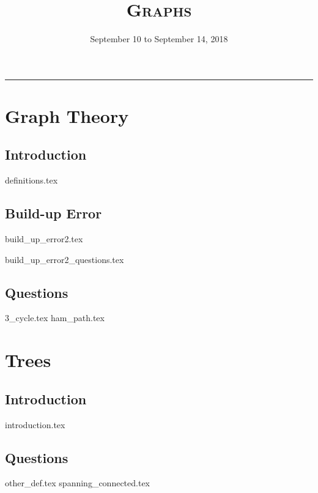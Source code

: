 \documentclass{exam}
\title{\textsc{Graphs}}
\date{September 10 to September 14, 2018}
\begin{document}
\maketitle
\rule{\textwidth}{0.15em}
\fontsize{12}{15}\selectfont
\thispagestyle{empty}

\section{Graph Theory}
\subsection{Introduction}
\begin{questions}
{definitions.tex}
\end{questions}

\subsection{Build-up Error}
{build_up_error2.tex}
\begin{questions}
{build_up_error2_questions.tex}
\end{questions}

\subsection{Questions}
\begin{questions}
{3_cycle.tex}
\newpage
{ham_path.tex}
\end{questions}

\section{Trees}
\subsection{Introduction}
{introduction.tex}
\newpage
\subsection{Questions}
\begin{questions}
{other_def.tex}
{spanning_connected.tex}
\end{questions}
\end{document}
